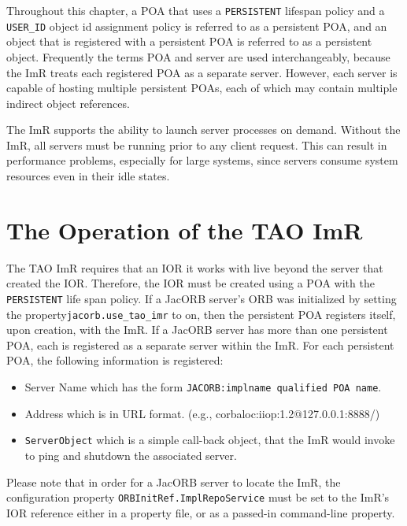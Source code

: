 Throughout this chapter, a POA that uses a {\tt PERSISTENT} lifespan
policy and  a {\tt USER\_ID} object id assignment policy is referred to as
a persistent POA, and an object that is registered with a persistent POA is
referred to as a persistent object.  Frequently the terms POA and server are
used interchangeably, because the ImR treats each registered POA as a
separate server. However, each server is capable of hosting multiple
persistent POAs, each of which may contain multiple indirect object
references.

The ImR supports the ability to launch server processes on demand.
Without the ImR, all servers must be running prior to any client request.
This can result in performance problems, especially for large systems,
since servers consume system resources even in their idle states.

\section{The Operation of the TAO ImR}

The TAO ImR requires that an IOR it works with live beyond the server
that created the IOR. Therefore, the IOR must be created using a POA with
the {\tt PERSISTENT} life span policy. If a JacORB server’s ORB was
initialized by setting the property{\tt  jacorb.use\_tao\_imr} to on, then the
persistent POA registers itself, upon creation, with the ImR.  If a JacORB
server has more than one persistent POA, each is registered as a separate
server within the ImR. For each persistent POA, the following information
is registered:

\begin{itemize}
     \item Server Name which has the form
       {\tt JACORB:implname qualified POA name}.
     \item Address which is in URL format.
              (e.g., corbaloc:iiop:1.2@127.0.0.1:8888/)
     \item {\tt ServerObject} which is a simple call-back object, that the
               ImR would invoke to ping and shutdown the associated server.
\end{itemize}

Please note that in order for a JacORB server to locate the ImR,
the configuration property {\tt ORBInitRef.ImplRepoService} must be set to
the ImR's IOR reference  either in a property file, or as a passed-in
command-line property.

